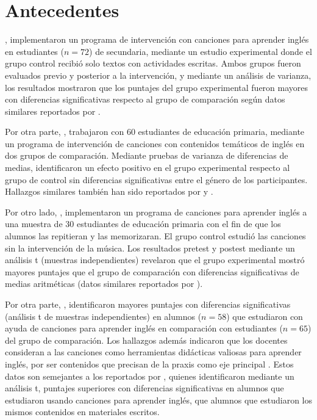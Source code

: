 \documentclass[spanish]{textolivre}
\begin{document}
\section{Antecedentes}

\textcite{saldiraner2021using}, implementaron un programa de intervención con canciones para aprender inglés en estudiantes ($n=72$) de secundaria, mediante un estudio experimental donde el grupo control recibió solo textos con actividades escritas. Ambos grupos fueron evaluados previo y posterior a la intervención, y mediante un análisis de varianza, los resultados mostraron que los puntajes del grupo experimental fueron mayores con diferencias significativas respecto al grupo de comparación según datos similares reportados por \textcite{forster2006value}.

Por otra parte, \textcite{ghanbari2014effects}, trabajaron con 60 estudiantes de educación primaria, mediante un programa de intervención de canciones con contenidos temáticos de inglés en dos grupos de comparación. Mediante pruebas de varianza de diferencias de medias, identificaron un efecto positivo en el grupo experimental respecto al grupo de control sin diferencias significativas entre el género de los participantes. Hallazgos similares también han sido reportados por \textcite{kocaman2016effects} y \textcite{wahyuningsih2019kreasi}.

Por otro lado, \textcite{moradi2014effect}, implementaron un programa de canciones para aprender inglés a una muestra de 30 estudiantes de educación primaria con el fin de que los alumnos las repitieran y las memorizaran. El grupo control estudió las canciones sin la intervención de la música. Los resultados pretest y postest mediante un análisis t (muestras independientes) revelaron que el grupo experimental mostró mayores puntajes que el grupo de comparación con diferencias significativas de medias aritméticas (datos similares reportados por \textcite{lestari2020vocabulary}).

Por otra parte, \textcite{shehadejiman2016effectiveness}, identificaron mayores puntajes con diferencias significativas (análisis t de muestras independientes) en alumnos ($n=58$) que estudiaron con ayuda de canciones para aprender inglés en comparación con estudiantes ($n=65$) del grupo de comparación. Los hallazgos además indicaron que los docentes consideran a las canciones como herramientas didácticas valiosas para aprender inglés, por ser contenidos que precisan de la praxis como eje principal \cite{shehadejiman2016effectiveness}. Estos datos son semejantes a los reportados por \textcite{yusmita2017effects}, quienes identificaron mediante un análisis t, puntajes superiores con diferencias significativas en alumnos que estudiaron usando canciones para aprender inglés, que alumnos que estudiaron los mismos contenidos en materiales escritos.
\end{document}
